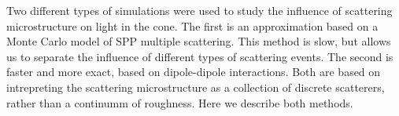 Two different types of simulations were used to study the influence of
scattering microstructure on light in the cone.  The first is an
approximation based on a Monte Carlo model of SPP multiple scattering.
This method is slow, but allows us to separate the influence of different
types of scattering events.  The second is faster and more exact, based on
dipole-dipole interactions.  Both are based on intrepreting the scattering
microstructure as a collection of discrete scatterers, rather than a
continumm of roughness.  Here we describe both methods.
